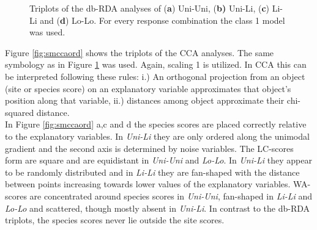 \begin{figure}[h!]
			\caption{Triplots of the db-RDA analyses of (\textbf{a}) Uni-Uni, (\textbf{b)} Uni-Li, (\textbf{c}) Li-Li and (\textbf{d}) Lo-Lo. For every response combination the class 1 model was used.}
			\label{fig:smdbord}
			
		\end{figure}
	
		
		Figure \ref{fig:smccaord} shows the triplots of the CCA analyses.
		The same symbology as in Figure \ref{fig:smdbord} was used.
		Again, scaling 1 is utilized.
		In CCA this can be interpreted following these rules: 
		i.) An orthogonal projection from an object (site or species score) on an explanatory variable approximates that object's position along that variable, ii.)  distances among object approximate their chi-squared distance. \\
		In Figure \ref{fig:smccaord} a,c and d the species scores are placed correctly relative to the explanatory variables. 
		In \textit{Uni-Li} they are only ordered along the unimodal gradient and the second axis is determined by noise variables.
		The LC-scores form are square and are equidistant in \textit{Uni-Uni} and \textit{Lo-Lo}. 
		In \textit{Uni-Li} they appear to be randomly distributed and in \textit{Li-Li} they are fan-shaped with the distance between points increasing towards lower values of the explanatory variables. 
		WA-scores are concentrated around species scores in \textit{Uni-Uni}, fan-shaped in \textit{Li-Li} and \textit{Lo-Lo} and scattered, though mostly absent in \textit{Uni-Li}. 
		In contrast to the db-RDA triplots, the species scores never lie outside the site scores. 
		
